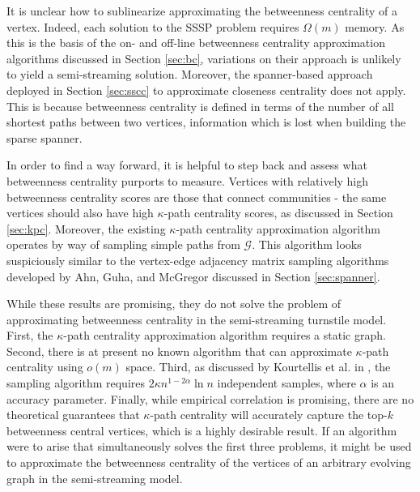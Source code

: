 \documentclass{report}
\newcommand{\algoname}[1]{\textnormal{\textsc{#1}}}
\begin{document}
It is unclear how to sublinearize approximating the betweenness centrality of a vertex.
Indeed, each solution to the \algoname{SSSP} problem requires $\Omega(m)$ memory.
As this is the basis of the on- and off-line  betweenness centrality approximation algorithms discussed in Section \ref{sec:bc}, variations on their approach is unlikely to yield a semi-streaming solution.
Moreover, the spanner-based approach deployed in Section \ref{sec:sscc} to approximate closeness centrality does not apply.
This is because betweenness centrality is defined in terms of the number of all shortest paths between two vertices, information which is lost when building the sparse spanner.




In order to find a way forward, it is helpful to step back and assess what betweenness centrality purports to measure.
Vertices with relatively high betweenness centrality scores are those that connect communities - the same vertices should also have high $\kappa$-path centrality scores, as discussed in Section \ref{sec:kpc}. 
Moreover, the existing $\kappa$-path centrality approximation algorithm operates by way of sampling simple paths from $\mathcal{G}$.
This algorithm looks suspiciously similar to the vertex-edge adjacency matrix sampling algorithms developed by Ahn, Guha, and McGregor discussed in Section \ref{sec:spanner}. 

While these results are promising, they do not solve the problem of approximating betweenness centrality in the semi-streaming turnstile model. 
First, the $\kappa$-path centrality approximation algorithm requires a static graph. 
Second, there is at present no known algorithm that can approximate $\kappa$-path centrality using $o(m)$ space. 
Third, as discussed by Kourtellis et al. in \cite{kourtellis2013identifying}, the sampling algorithm requires $2 \kappa n^{1-2\alpha} \ln n$ independent samples, where $\alpha$ is an accuracy parameter. 
Finally, while empirical correlation is promising, there are no theoretical guarantees that $\kappa$-path centrality will accurately capture the top-$k$ betweenness central vertices, which is a highly desirable result. 
If an algorithm were to arise that simultaneously solves the first three problems, it might be used to approximate the betweenness centrality of the vertices of an arbitrary evolving graph in the semi-streaming model. 
\end{document}
